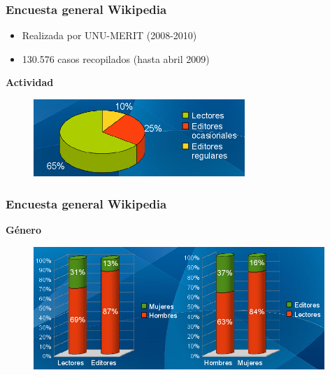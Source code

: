 \begin{frame}
\frametitle{Encuesta general Wikipedia}

\begin{itemize}
 \item Realizada por UNU-MERIT (2008-2010)
 \item 130.576 casos recopilados (hasta abril 2009)
\end{itemize}

\large{\textbf{Actividad}}

\begin{figure}[htp]
\centering
\includegraphics[width=8cm]{figs/gsurv-actividad.png}
\end{figure}

\end{frame}


\begin{frame}
\frametitle{Encuesta general Wikipedia}

\large{\textbf{Género}}

\begin{figure}[htp]
\centering
\includegraphics[width=11cm]{figs/gsurv-genero.png}
\end{figure}

\end{frame}



